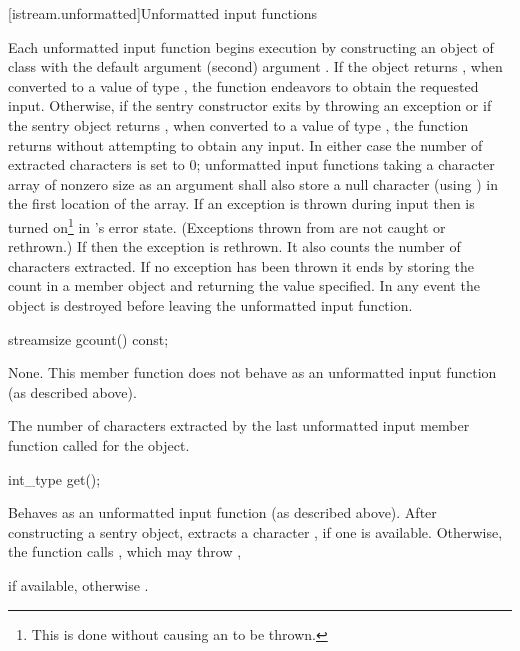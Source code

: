 [istream.unformatted]{Unformatted input functions}

\pnum
Each unformatted input function begins execution by constructing an object of class
with the default argument
(second) argument
.
If the
object returns
,
when converted to a value of type
,
the function endeavors
to obtain the requested input.
Otherwise, if the sentry constructor exits by throwing an exception or if
the sentry object returns , when converted to a value of type
,
the function returns without attempting to obtain any input.
In either case the number of extracted characters is set to 0;
unformatted input functions taking a character array of nonzero size as
an argument shall also store a null character (using
)
in the first location of the array.
If an exception is thrown during input then
is turned on\footnote{This is done without causing an
to be thrown.}
in
's
error state.
(Exceptions thrown from
are not caught or rethrown.)
If
then the exception is rethrown.
It also counts the number of characters extracted.
If no exception has been thrown it ends
by storing the count in a member object
and returning the value specified.
In any event the
object
is destroyed before leaving the unformatted input function.

%
\begin{itemdecl}
streamsize gcount() const;
\end{itemdecl}

\begin{itemdescr}
\pnum
\effects
None.
This member function does not behave as an unformatted
input function (as described above).

\pnum
\returns
The number of characters
extracted by the last unformatted input member function called for the object.
\end{itemdescr}

%
\begin{itemdecl}
int_type get();
\end{itemdecl}

\begin{itemdescr}
\pnum
\effects
Behaves as an unformatted input function
(as described above).
After constructing a sentry object, extracts
a character , if one is available.
Otherwise, the function calls
,
which may throw
,

\pnum
\returns
{} if available,
otherwise
.
\end{itemdescr}


